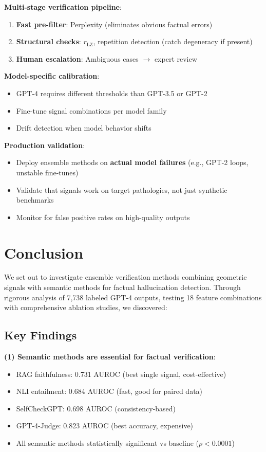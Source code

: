 \documentclass[11pt]{article}
\begin{document}
\textbf{Multi-stage verification pipeline}:
\begin{enumerate}
\item \textbf{Fast pre-filter}: Perplexity (eliminates obvious factual errors)
\item \textbf{Structural checks}: $r_{\text{LZ}}$, repetition detection (catch degeneracy if present)
\item \textbf{Human escalation}: Ambiguous cases $\rightarrow$ expert review
\end{enumerate}

\textbf{Model-specific calibration}:
\begin{itemize}
\item GPT-4 requires different thresholds than GPT-3.5 or GPT-2
\item Fine-tune signal combinations per model family
\item Drift detection when model behavior shifts
\end{itemize}

\textbf{Production validation}:
\begin{itemize}
\item Deploy ensemble methods on \textbf{actual model failures} (e.g., GPT-2 loops, unstable fine-tunes)
\item Validate that signals work on target pathologies, not just synthetic benchmarks
\item Monitor for false positive rates on high-quality outputs
\end{itemize}

\section{Conclusion}
\label{sec:conclusion}

We set out to investigate ensemble verification methods combining geometric signals with semantic methods for factual hallucination detection. Through rigorous analysis of 7,738 labeled GPT-4 outputs, testing 18 feature combinations with comprehensive ablation studies, we discovered:

\subsection{Key Findings}

\textbf{(1) Semantic methods are essential for factual verification}:
\begin{itemize}
\item RAG faithfulness: 0.731 AUROC (best single signal, cost-effective)
\item NLI entailment: 0.684 AUROC (fast, good for paired data)
\item SelfCheckGPT: 0.698 AUROC (consistency-based)
\item GPT-4-Judge: 0.823 AUROC (best accuracy, expensive)
\item All semantic methods statistically significant vs baseline ($p < 0.0001$)
\end{itemize}
\end{document}

